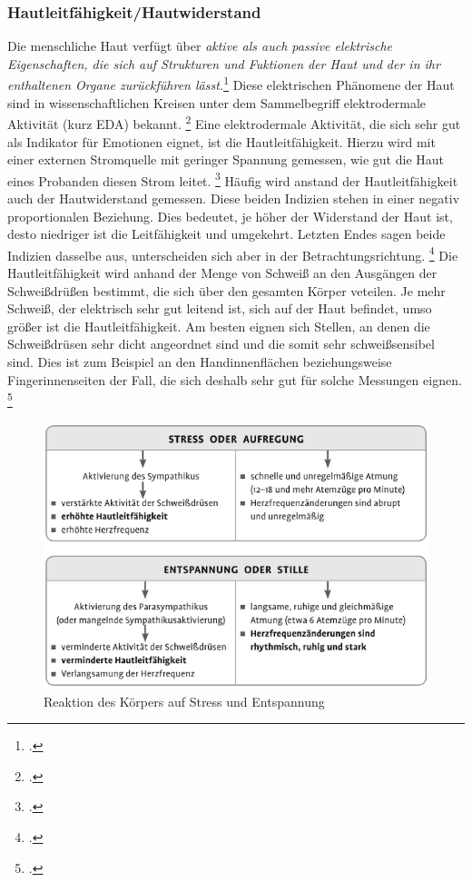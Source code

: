 \subsubsection{Hautleitfähigkeit/Hautwiderstand}
Die menschliche Haut verfügt über \glqq \textit{aktive als auch passive elektrische Eigenschaften, die sich auf Strukturen und Fuktionen der Haut und der in ihr enthaltenen Organe zurückführen lässt.}\grqq{}\footcite[][S. 2]{Bou88} Diese elektrischen Phänomene der Haut sind in wissenschaftlichen Kreisen unter dem Sammelbegriff elektrodermale Aktivität (kurz EDA) bekannt. \footcite[Vgl.][S. 2]{Bou88}
Eine elektrodermale Aktivität, die sich sehr gut als Indikator für Emotionen eignet, ist die Hautleitfähigkeit. Hierzu wird mit einer externen Stromquelle mit geringer Spannung gemessen, wie gut die Haut eines Probanden diesen Strom leitet. \footcite[Vgl. ][S.77]{Moe07} Häufig wird anstand der Hautleitfähigkeit auch der Hautwiderstand gemessen. Diese beiden Indizien stehen in einer negativ proportionalen Beziehung. Dies bedeutet, je höher der Widerstand der Haut ist, desto niedriger ist die Leitfähigkeit und umgekehrt. Letzten Endes sagen beide Indizien dasselbe aus, unterscheiden sich aber in der Betrachtungsrichtung. \footcite[Vgl. ][S. 28]{Die06} \newline
Die Hautleitfähigkeit wird anhand der Menge von Schweiß an den Ausgängen der Schweißdrüßen bestimmt, die sich über den gesamten Körper veteilen. Je mehr Schweiß, der elektrisch sehr gut leitend ist, sich auf der Haut befindet, umso größer ist die Hautleitfähigkeit. Am besten eignen sich  Stellen, an denen die Schweißdrüsen sehr dicht angeordnet sind und die somit sehr schweißsensibel sind. Dies ist zum Beispiel an den Handinnenflächen beziehungsweise Fingerinnenseiten der Fall, die sich deshalb sehr gut für solche Messungen eignen. \footcite[Vgl. ][S.77]{Moe07} 
\begin{figure}[h]
	\centering
	\includegraphics[width=14.6cm]{Bilder/symp.png}
	\caption[Reaktion des Körpers auf Stress und Entspannung]{Reaktion des Körpers auf Stress und Entspannung\footnotemark}
\end{figure}%
